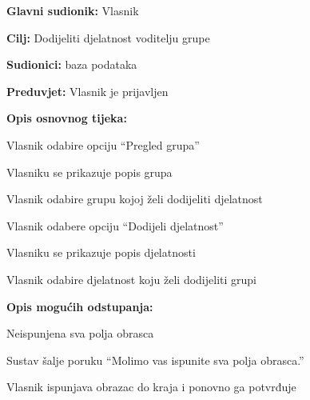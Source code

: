 			\begin{packed_item}
				\item \textbf{Glavni sudionik: } Vlasnik
				\item  \textbf{Cilj:} Dodijeliti djelatnost voditelju grupe
				\item  \textbf{Sudionici:} baza podataka
				\item  \textbf{Preduvjet:} Vlasnik je prijavljen
				\item  \textbf{Opis osnovnog tijeka:}
				\item[] \begin{packed_enum}
					\item Vlasnik odabire opciju “Pregled grupa”
					\item Vlasniku se prikazuje popis grupa
					\item Vlasnik odabire grupu kojoj želi dodijeliti djelatnost
					\item Vlasnik odabere opciju “Dodijeli djelatnost”
					\item Vlasniku se prikazuje popis djelatnosti
					\item Vlasnik odabire djelatnost koju želi dodijeliti grupi
				\end{packed_enum}
				\item  \textbf{Opis mogućih odstupanja:}
				\item[] \begin{packed_item}
					\item[4.a] Neispunjena sva polja obrasca
					\item[] \begin{packed_enum}
						\item Sustav šalje poruku “Molimo vas ispunite sva polja obrasca.”
						\item Vlasnik ispunjava obrazac do kraja i ponovno ga potvrđuje
					\end{packed_enum}
				\end{packed_item}
			\end{packed_item}
			\noindent {}
